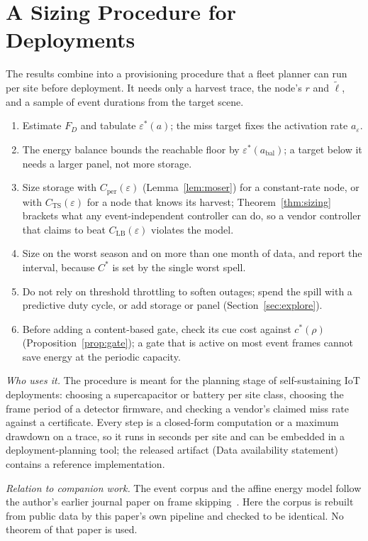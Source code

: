 \documentclass[final,5p,times,twocolumn]{elsarticle}
\theoremstyle{definition}
\theoremstyle{remark}
\newcommand{\eps}{\varepsilon}
\newcommand{\lt}{\tilde{\ell}}
\begin{document}
\section{A Sizing Procedure for Deployments}\label{sec:procedure}
The results combine into a provisioning procedure that a fleet planner can run per site before deployment. It needs only a harvest trace, the node's $r$ and $\lt$, and a sample of event durations from the target scene.
\begin{enumerate}
\item Estimate $F_D$ and tabulate $\eps^*(a)$; the miss target fixes the activation rate $a_\eps$.
\item The energy balance bounds the reachable floor by $\eps^*(a_{\mathrm{bal}})$; a target below it needs a larger panel, not more storage.
\item Size storage with $C_{\mathrm{per}}(\eps)$ (Lemma~\ref{lem:moser}) for a constant-rate node, or with $C_{\mathrm{TS}}(\eps)$ for a node that knows its harvest; Theorem~\ref{thm:sizing} brackets what any event-independent controller can do, so a vendor controller that claims to beat $C_{\mathrm{LB}}(\eps)$ violates the model.
\item Size on the worst season and on more than one month of data, and report the interval, because $C^*$ is set by the single worst spell.
\item Do not rely on threshold throttling to soften outages; spend the spill with a predictive duty cycle, or add storage or panel (Section~\ref{sec:explore}).
\item Before adding a content-based gate, check its cue cost against $c^*(\rho)$ (Proposition~\ref{prop:gate}); a gate that is active on most event frames cannot save energy at the periodic capacity.
\end{enumerate}
\emph{Who uses it.} The procedure is meant for the planning stage of self-sustaining IoT deployments: choosing a supercapacitor or battery per site class, choosing the frame period of a detector firmware, and checking a vendor's claimed miss rate against a certificate. Every step is a closed-form computation or a maximum drawdown on a trace, so it runs in seconds per site and can be embedded in a deployment-planning tool; the released artifact (Data availability statement) contains a reference implementation.

\emph{Relation to companion work.} The event corpus and the affine energy model follow the author's earlier journal paper on frame skipping~\cite{deep3_jiot2026}. Here the corpus is rebuilt from public data by this paper's own pipeline and checked to be identical. No theorem of that paper is used.
\end{document}
